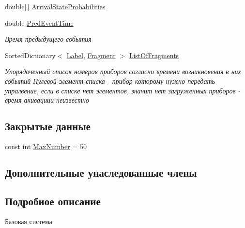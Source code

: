 \begin{DoxyCompactItemize}
\item 
double\mbox{[}$\,$\mbox{]} \hyperlink{class_network_simulator_1_1_service_node_afd54347835b7cdc3beacaa0c9eaf8592}{Arrival\+State\+Probabilities}
\item 
double \hyperlink{class_network_simulator_1_1_service_node_a5417a341416b75444bb1d853788228a7}{Pred\+Event\+Time}
\begin{DoxyCompactList}\small\item\em Время предыдущего события \end{DoxyCompactList}\item 
Sorted\+Dictionary$<$ \hyperlink{class_network_simulator_1_1_label}{Label}, \hyperlink{class_network_simulator_1_1_fragment}{Fragment} $>$ \hyperlink{class_network_simulator_1_1_service_node_aec726744aa9a2c5a657424ecc9666f27}{List\+Of\+Fragments}
\begin{DoxyCompactList}\small\item\em Упорядоченный список номеров приборов согласно времени возникновения в них событий Нулевой элемент списка -\/ прибор которому нужно передать упралвение, если в списке нет элементов, значит нет загруженных приборов -\/ время акивациии неизвестно \end{DoxyCompactList}\end{DoxyCompactItemize}
\subsection*{Закрытые данные}
\begin{DoxyCompactItemize}
\item 
const int \hyperlink{class_network_simulator_1_1_service_node_af7fdaf157c712f254b81ecc23ca8d843}{Max\+Number} = 50
\end{DoxyCompactItemize}
\subsection*{Дополнительные унаследованные члены}


\subsection{Подробное описание}
Базовая система 



